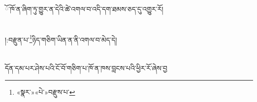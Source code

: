 ོ་ཁོ་ན་ཞིག་ཏུ་གྱུར་ན་དེའི་ཚེ་འགལ་བ་འདི་དག་ཐམས་ཅད་དུ་འགྱུར་རོ།\chapter{ }།:བརྫུན་པ་\footnote{«སྣར་»«པེ་»བརྫུས་པ་}ཉིད་གཅིག་ཡིན་ན་ནི་འགལ་བ་མེད་དེ།\chapter{ }དོན་དམ་པར་ཤེས་པའི་ངོ་བོ་གཅིག་པ་ཁོ་ན་ཁས་བླངས་པའི་ཕྱིར་རོ་ཞེས་བྱ